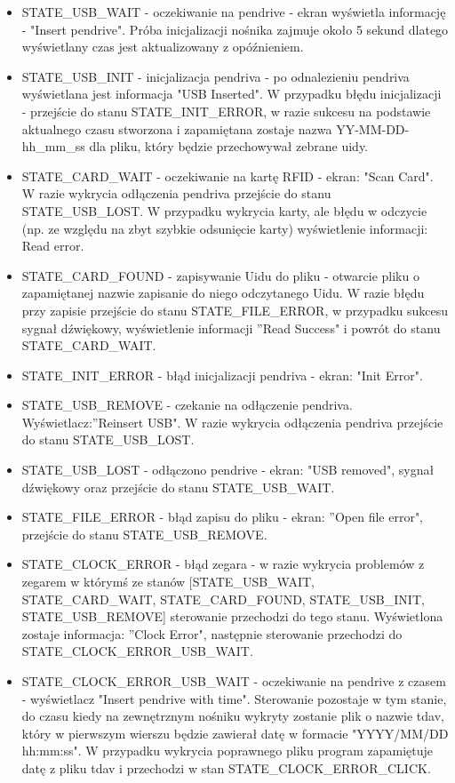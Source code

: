 \documentclass[declaration,shortabstract, mgr]{iithesis}
\begin{document}
\begin{itemize}
\item STATE\_USB\_WAIT - oczekiwanie na pendrive - ekran wyświetla informację - "Insert pendrive". Próba inicjalizacji nośnika zajmuje około 5 sekund dlatego wyświetlany czas jest aktualizowany z opóźnieniem.
\item STATE\_USB\_INIT - inicjalizacja pendriva - po odnalezieniu pendriva wyświetlana jest informacja "USB Inserted". W przypadku błędu inicjalizacji - przejście do stanu STATE\_INIT\_ERROR, w razie sukcesu na podstawie aktualnego czasu stworzona i zapamiętana zostaje nazwa YY-MM-DD-hh\_mm\_ss dla pliku, który będzie przechowywał zebrane uidy.
\item STATE\_CARD\_WAIT - oczekiwanie na kartę RFID - ekran: "Scan Card". W razie wykrycia odłączenia pendriva przejście do stanu STATE\_USB\_LOST. W przypadku wykrycia karty, ale błędu w odczycie (np. ze względu na zbyt szybkie odsunięcie karty) wyświetlenie informacji: Read error.
\item STATE\_CARD\_FOUND - zapisywanie Uidu do pliku - otwarcie pliku o zapamiętanej nazwie zapisanie do niego odczytanego Uidu. W razie błędu przy zapisie przejście do stanu STATE\_FILE\_ERROR, w przypadku sukcesu sygnał dźwiękowy, wyświetlenie informacji ''Read Success" i powrót do stanu STATE\_CARD\_WAIT.
\item STATE\_INIT\_ERROR - błąd inicjalizacji pendriva - ekran: "Init Error".
\item STATE\_USB\_REMOVE - czekanie na odłączenie pendriva. Wyświetlacz:''Reinsert USB". W razie wykrycia odłączenia pendriva przejście do stanu STATE\_USB\_LOST.
\item STATE\_USB\_LOST - odłączono pendrive - ekran: "USB removed", sygnał dźwiękowy oraz przejście do stanu STATE\_USB\_WAIT.
\item STATE\_FILE\_ERROR - błąd zapisu do pliku - ekran: ''Open file error", przejście do stanu STATE\_USB\_REMOVE.
\item STATE\_CLOCK\_ERROR - błąd zegara - w razie wykrycia problemów z zegarem w którymś ze stanów [STATE\_USB\_WAIT, STATE\_CARD\_WAIT, STATE\_CARD\_FOUND, STATE\_USB\_INIT, STATE\_USB\_REMOVE] sterowanie przechodzi do tego stanu. Wyświetlona zostaje informacja: ''Clock Error", następnie sterowanie przechodzi do STATE\_CLOCK\_ERROR\_USB\_WAIT.
\item STATE\_CLOCK\_ERROR\_USB\_WAIT - oczekiwanie na pendrive z czasem - wyświetlacz "Insert pendrive with time". Sterowanie pozostaje w tym stanie, do czasu kiedy na zewnętrznym nośniku wykryty zostanie plik o nazwie tdav, który w pierwszym wierszu będzie zawierał datę w formacie "YYYY/MM/DD hh:mm:ss". W przypadku wykrycia poprawnego pliku program zapamiętuje datę z pliku tdav i przechodzi w stan STATE\_CLOCK\_ERROR\_CLICK.\\

\end{itemize}
\end{document}
